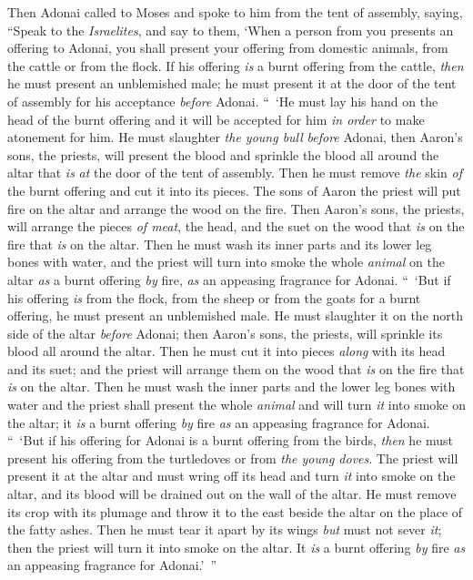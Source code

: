 
\begin{biblechapter} %
 Then Adonai called to Moses and spoke to him from the tent of assembly, saying,
\verse “Speak to the \textit{Israelites}, and say to them, ‘When a person from you presents an offering to Adonai, you shall present your offering from domestic animals, from the cattle or from the flock.
\verse If his offering \textit{is} a burnt offering from the cattle, \textit{then} he must present an unblemished male; he must present it at the door of the tent of assembly for his acceptance \textit{before} Adonai.
\verse “ ‘He must lay his hand on the head of the burnt offering and it will be accepted for him \textit{in order} to make atonement for him.
\verse He must slaughter \textit{the young bull} \textit{before} Adonai, then Aaron’s sons, the priests, will present the blood and sprinkle the blood all around the altar that \textit{is} \textit{at} the door of the tent of assembly.
\verse Then he must remove \textit{the} skin \textit{of} the burnt offering and cut it into its pieces.
\verse The sons of Aaron the priest will put fire on the altar and arrange the wood on the fire.
\verse Then Aaron’s sons, the priests, will arrange the pieces \textit{of meat}, the head, and the suet on the wood that \textit{is} on the fire that \textit{is} on the altar.
\verse Then he must wash its inner parts and its lower leg bones with water, and the priest will turn into smoke the whole \textit{animal} on the altar \textit{as} a burnt offering \textit{by} fire, \textit{as} an appeasing fragrance for Adonai.
\verse “ ‘But if his offering \textit{is} from the flock, from the sheep or from the goats for a burnt offering, he must present an unblemished male.
\verse He must slaughter it on the north side of the altar \textit{before} Adonai; then Aaron’s sons, the priests, will sprinkle its blood all around the altar.
\verse Then he must cut it into pieces \textit{along} with its head and its suet; and the priest will arrange them on the wood that \textit{is} on the fire that \textit{is} on the altar.
\verse Then he must wash the inner parts and the lower leg bones with water and the priest shall present the whole \textit{animal} and will turn \textit{it} into smoke on the altar; it \textit{is} a burnt offering \textit{by} fire \textit{as} an appeasing fragrance for Adonai.
\verse “ ‘But if his offering for Adonai is a burnt offering from the birds, \textit{then} he must present his offering from the turtledoves or from \textit{the young doves}.
\verse The priest will present it at the altar and must wring off its head and turn \textit{it} into smoke on the altar, and its blood will be drained out on the wall of the altar.
\verse He must remove its crop with its plumage and throw it to the east beside the altar on the place of the fatty ashes.
\verse Then he must tear it apart by its wings \textit{but} must not sever \textit{it}; then the priest will turn it into smoke on the altar. It \textit{is} a burnt offering \textit{by} fire \textit{as} an appeasing fragrance for Adonai.’ ”
\end{biblechapter}

